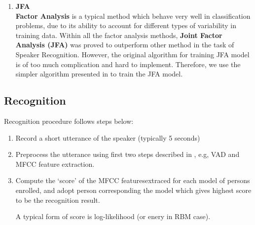 \begin{enumerate}
		\item \textbf{JFA} \\
			\textbf{Factor Analysis} is a typical method which behave
			very well in classification problems, due to its ability to
			account for different types of variability in training data.
			Within all the factor analysis methods,
			\textbf{Joint Factor Analysis (JFA)} \cite{jfa2,jfa-se} was proved to outperform other method
			in the task of Speaker Recognition.
			However, the original algorithm \cite{jfa-se} for training JFA model is of
			too much complication and hard to implement.
			Therefore, we use the simpler algorithm presented in \cite{jfa-study}
			to train the JFA model.

	\end{enumerate}

\subsection{Recognition}
	Recognition procedure follows steps below:
	\begin{enumerate}
		\item Record a short utterance of the speaker (typically 5 seconds)
		\item Preprocess the utterance using first two steps described in
			, e.g, VAD and MFCC feature extraction.
		\item Compute the `score' of the MFCC featuresextraced for each model of persons
			enrolled, and adopt person corresponding the model which gives highest score to be the
			recognition result.

			A typical form of score is log-likelihood (or enery in RBM case).

	\end{enumerate}

